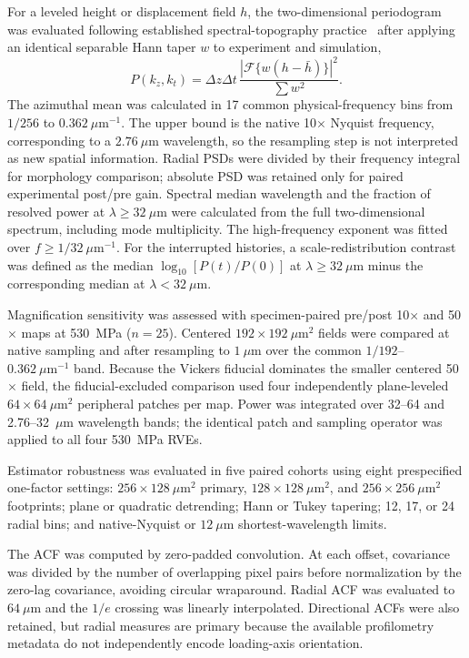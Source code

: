 \documentclass[final,12pt]{cas-sc}
\begin{document}
For a leveled height or displacement field $h$, the two-dimensional periodogram was evaluated following established spectral-topography practice~\cite{jacobs2017spectral} after applying an identical separable Hann taper $w$ to experiment and simulation,
\begin{equation}
    P(k_z,k_t)=\Delta z\Delta t\,
    \frac{\left|\mathcal{F}\{w(h-\bar h)\}\right|^2}{\sum w^2}.
\end{equation}
The azimuthal mean was calculated in 17 common physical-frequency bins from $1/256$ to $0.362~\mu\mathrm{m}^{-1}$. The upper bound is the native 10$\times$ Nyquist frequency, corresponding to a $2.76~\mu$m wavelength, so the resampling step is not interpreted as new spatial information. Radial PSDs were divided by their frequency integral for morphology comparison; absolute PSD was retained only for paired experimental post/pre gain. Spectral median wavelength and the fraction of resolved power at $\lambda\geq32~\mu$m were calculated from the full two-dimensional spectrum, including mode multiplicity. The high-frequency exponent was fitted over $f\geq1/32~\mu\mathrm{m}^{-1}$. For the interrupted histories, a scale-redistribution contrast was defined as the median $\log_{10}[P(t)/P(0)]$ at $\lambda\geq32~\mu$m minus the corresponding median at $\lambda<32~\mu$m.

Magnification sensitivity was assessed with specimen-paired pre/post 10$\times$ and 50$\times$ maps at 530~MPa ($n=25$). Centered $192\times192~\mu\mathrm{m}^2$ fields were compared at native sampling and after resampling to $1~\mu$m over the common $1/192$--$0.362~\mu\mathrm{m}^{-1}$ band. Because the Vickers fiducial dominates the smaller centered 50$\times$ field, the fiducial-excluded comparison used four independently plane-leveled $64\times64~\mu\mathrm{m}^2$ peripheral patches per map. Power was integrated over 32--64 and 2.76--32~$\mu$m wavelength bands; the identical patch and sampling operator was applied to all four 530~MPa RVEs.

Estimator robustness was evaluated in five paired cohorts using eight prespecified one-factor settings: $256\times128~\mu\mathrm{m}^2$ primary, $128\times128~\mu\mathrm{m}^2$, and $256\times256~\mu\mathrm{m}^2$ footprints; plane or quadratic detrending; Hann or Tukey tapering; 12, 17, or 24 radial bins; and native-Nyquist or $12~\mu$m shortest-wavelength limits.

The ACF was computed by zero-padded convolution. At each offset, covariance was divided by the number of overlapping pixel pairs before normalization by the zero-lag covariance, avoiding circular wraparound. Radial ACF was evaluated to $64~\mu$m and the $1/e$ crossing was linearly interpolated. Directional ACFs were also retained, but radial measures are primary because the available profilometry metadata do not independently encode loading-axis orientation.
\end{document}
